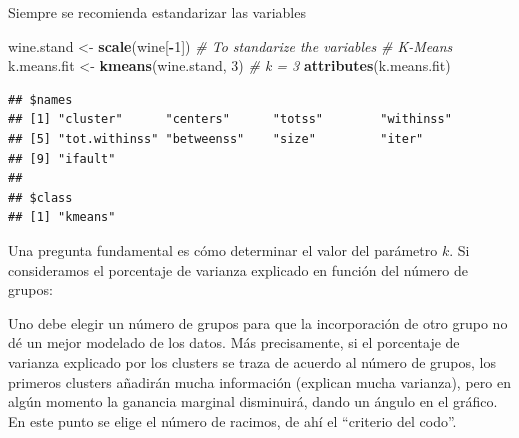 \documentclass[]{book}
\newenvironment{Shaded}{\begin{snugshade}}{\end{snugshade}}
\newcommand{\KeywordTok}[1]{\textcolor[rgb]{0.13,0.29,0.53}{\textbf{#1}}}
\newcommand{\DataTypeTok}[1]{\textcolor[rgb]{0.13,0.29,0.53}{#1}}
\newcommand{\DecValTok}[1]{\textcolor[rgb]{0.00,0.00,0.81}{#1}}
\newcommand{\StringTok}[1]{\textcolor[rgb]{0.31,0.60,0.02}{#1}}
\newcommand{\CommentTok}[1]{\textcolor[rgb]{0.56,0.35,0.01}{\textit{#1}}}
\newcommand{\ControlFlowTok}[1]{\textcolor[rgb]{0.13,0.29,0.53}{\textbf{#1}}}
\newcommand{\OperatorTok}[1]{\textcolor[rgb]{0.81,0.36,0.00}{\textbf{#1}}}
\newcommand{\NormalTok}[1]{#1}
\begin{document}
Siempre se recomienda estandarizar las variables

\begin{Shaded}
\begin{Highlighting}[]
\NormalTok{wine.stand <-}\StringTok{ }\KeywordTok{scale}\NormalTok{(wine[}\OperatorTok{-}\DecValTok{1}\NormalTok{])  }\CommentTok{# To standarize the variables}
\CommentTok{# K-Means}
\NormalTok{k.means.fit <-}\StringTok{ }\KeywordTok{kmeans}\NormalTok{(wine.stand, }\DecValTok{3}\NormalTok{) }\CommentTok{# k = 3}
\KeywordTok{attributes}\NormalTok{(k.means.fit)}
\end{Highlighting}
\end{Shaded}

\begin{verbatim}
## $names
## [1] "cluster"      "centers"      "totss"        "withinss"    
## [5] "tot.withinss" "betweenss"    "size"         "iter"        
## [9] "ifault"      
## 
## $class
## [1] "kmeans"
\end{verbatim}

Una pregunta fundamental es cómo determinar el valor del parámetro
\(k\). Si consideramos el porcentaje de varianza explicado en función
del número de grupos:

Uno debe elegir un número de grupos para que la incorporación de otro
grupo no dé un mejor modelado de los datos. Más precisamente, si el
porcentaje de varianza explicado por los clusters se traza de acuerdo al
número de grupos, los primeros clusters añadirán mucha información
(explican mucha varianza), pero en algún momento la ganancia marginal
disminuirá, dando un ángulo en el gráfico. En este punto se elige el
número de racimos, de ahí el ``criterio del codo''.

\begin{Shaded}
\end{Shaded}
\end{document}
